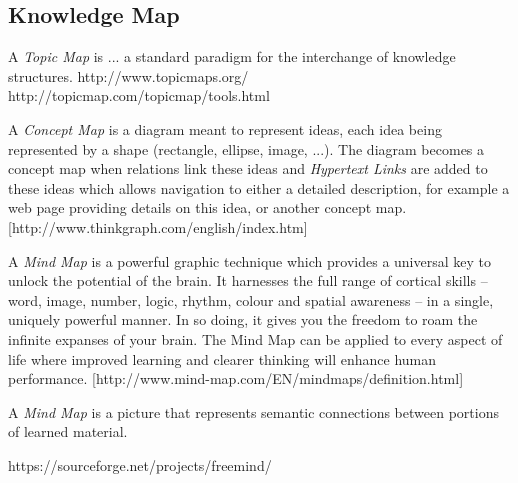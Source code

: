 %
%
%
%
%
%
%

\subsection{Knowledge Map}
\label{knowledge_map_heading}

A \emph{Topic Map} is ... a standard paradigm for the interchange of knowledge structures.
http://www.topicmaps.org/
http://topicmap.com/topicmap/tools.html

A \emph{Concept Map} is a diagram meant to represent ideas, each idea being
represented by a shape (rectangle, ellipse, image, ...). The diagram becomes
a concept map when relations link these ideas and \emph{Hypertext Links} are
added to these ideas which allows navigation to either a detailed description,
for example a web page providing details on this idea, or another concept map.
\cite{} [http://www.thinkgraph.com/english/index.htm]

A \emph{Mind Map} is a powerful graphic technique which provides a universal
key to unlock the potential of the brain. It harnesses the full range of cortical
skills -- word, image, number, logic, rhythm, colour and spatial awareness --
in a single, uniquely powerful manner. In so doing, it gives you the freedom
to roam the infinite expanses of your brain. The Mind Map can be applied to
every aspect of life where improved learning and clearer thinking will enhance
human performance.
\cite{} [http://www.mind-map.com/EN/mindmaps/definition.html]

A \emph{Mind Map} is a picture that represents semantic connections between
portions of learned material.
\cite[http://en.wikipedia.org/wiki/Mind_mapping]{wikipedia}

https://sourceforge.net/projects/freemind/
